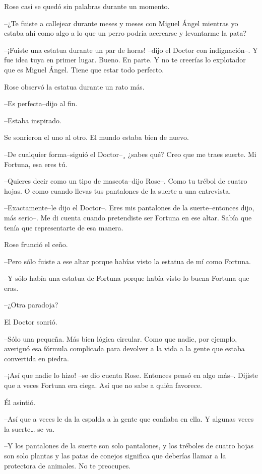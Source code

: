 Rose casi se quedó sin palabras durante un momento.

--¿Te fuiste a callejear durante meses y meses con Miguel Ángel mientras
yo estaba ahí como algo a lo que un perro podría acercarse y levantarme
la pata?

--¡Fuiste una estatua durante un par de horas! --dijo el Doctor con
indignación--. Y fue idea tuya en primer lugar. Bueno. En parte. Y no te
creerías lo explotador que es Miguel Ángel. Tiene que estar todo
perfecto.

Rose observó la estatua durante un rato más.

--Es perfecta--dijo al fin.

--Estaba inspirado.

Se sonrieron el uno al otro. El mundo estaba bien de nuevo.

--De cualquier forma--siguió el Doctor--¸ ¿sabes qué? Creo que me traes
suerte. Mi Fortuna, esa eres tú.

--Quieres decir como un tipo de mascota--dijo Rose--. Como tu trébol de
cuatro hojas. O como cuando llevas tus pantalones de la suerte a una
entrevista.

--Exactamente--le dijo el Doctor--. Eres mis pantalones de la
suerte--entonces dijo, más serio--. Me di cuenta cuando pretendiste ser
Fortuna en ese altar. Sabía que tenía que representarte de esa manera.

Rose frunció el ceño.

--Pero sólo fuiste a ese altar porque habías visto la estatua de mí como
Fortuna.

--Y sólo había una estatua de Fortuna porque había visto lo buena
Fortuna que eras.

--¿Otra paradoja?

El Doctor sonrió.

--Sólo una pequeña. Más bien lógica circular. Como que nadie, por
ejemplo, averiguó esa fórmula complicada para devolver a la vida a la
gente que estaba convertida en piedra.

--¡Así que nadie lo hizo! --se dio cuenta Rose. Entonces pensó en algo
más--. Dijiste que a veces Fortuna era ciega. Así que no sabe a quién
favorece.

Él asintió.

--Así que a veces le da la espalda a la gente que confiaba en ella. Y
algunas veces la suerte\ldots{} se va.

--Y los pantalones de la suerte son solo pantalones, y los tréboles de
cuatro hojas son solo plantas y las patas de conejos significa que
deberías llamar a la protectora de animales. No te preocupes.

